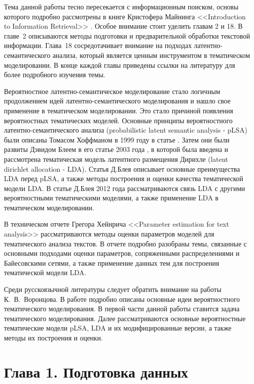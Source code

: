 \documentclass[a4paper]{report}
\begin{document}
	Тема данной работы тесно пересекается с информационным поиском, основы которого подробно рассмотрены в книге Кристофера Майнинга <<Introduction to Information Retrieval>> \cite{bib:InformationRetrieval}. Особое внимание стоит уделить главам 2 и 18. В главе~2 описываются методы подготовки и предварительной обработки текстовой информации. Глава~18 сосредотачивает внимание на подходах латентно-семантического анализа, который является ценным инструментом в тематическом моделировании. В конце каждой главы приведены ссылки на литературу для более подробного изучения темы. 
	
	Вероятностное латентно-семантическое моделирование стало логичным продолжением идей латентно-семантического моделирования и нашло свое применение в тематическом моделировании. Это стало причиной появления вероятностных тематических моделей. Основные принципы вероятностного латентно-семантического анализа (probabilistic latent semantic analysis - pLSA) были описаны Томасом Хоффманом в 1999 году в статье \cite{bib:Hoffman}. Затем они были развиты Дэвидом Блеем в его статье 2003 года \cite{bib:Blei}, в которой была введена и рассмотрена тематическая модель латентного размещения Дирихле (latent dirichlet allocation - LDA). Статья Д.Блея описывает основные преимущества LDA перед pLSA, а также методы построения и оценки качества тематической модели LDA. В статье Д.Блея 2012 года \cite{bib:Blei2} рассматриваются связь LDA с другими вероятностными тематическими моделями, а также применение LDA в тематическом моделировании.
	
	В техническом отчете Грегора Хейнрича <<Parameter estimation for text analysis>> \cite{bib:Heinrich}  рассматриваются методы оценки параметров моделей для тематического анализа текстов. В отчете подробно разобраны темы, связанные с основными подходами оценки параметров, сопряженными распределениями и Байесовскими сетями, а также применение данных тем для построения тематической модели LDA. 
	
	 Среди русскоязычной литературы следует обратить внимание на работы К.~В.~Воронцова.  В работе \cite{bib:Voron1} подробно описаны основные идеи вероятностного тематического моделирования. В первой части данной работы ставится задача тематического моделирования. Далее рассматриваются основные вероятностные тематические модели pLSA, LDA и их модифицированные версии, а также методы их построения и оценки.
	

	
	
	
	\section{Глава 1. Подготовка данных}
\end{document}
